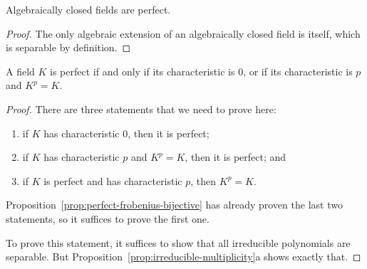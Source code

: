 \begin{proposition}
    Algebraically closed fields are perfect.
\end{proposition}
\begin{proof}
    The only algebraic extension of an algebraically closed field is itself,
    which is separable by definition.
\end{proof}

\begin{theorem}\label{thm:perfect-field-condition}
    A field \(K\) is perfect
    if and only if its characteristic is 0,
    or if its characteristic is \(p\) and \(K^p = K\).
\end{theorem}
\begin{proof}
    There are three statements that we need to prove here:
    \begin{enumerate}[label={(\alph*)}, itemsep=0mm]
        \item if \(K\) has characteristic 0, then it is perfect;
        \item if \(K\) has characteristic \(p\) and \(K^p = K\), then it is perfect; and
        \item if \(K\) is perfect and has characteristic \(p\), then \(K^p = K\).
    \end{enumerate}
    Proposition~\ref{prop:perfect-frobenius-bijective} has already proven the last two statements,
    so it suffices to prove the first one.
    
    To prove this statement, it suffices to show that all irreducible polynomials are separable.
    But Proposition~\ref{prop:irreducible-multiplicity}a shows exactly that.
\end{proof}

